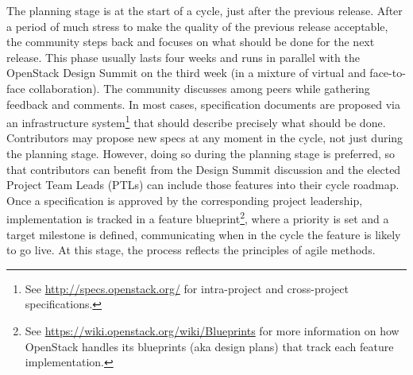 \documentclass[dvipsnames]{interact}
\theoremstyle{plain}\newtheorem{theorem}{Theorem}[section]
\theoremstyle{definition}
\theoremstyle{remark}
\begin{document}
The planning stage is at the start of a cycle, just after the previous release. After a period of much stress to make the quality of the previous release acceptable, the community steps back and focuses on what should be done for the next release. This phase usually lasts four weeks and runs in parallel with the OpenStack Design Summit on the third week (in a mixture of virtual and face-to-face collaboration). The community discusses among peers while gathering feedback and comments. In most cases, specification documents are proposed via an infrastructure system\footnote{See \url{http://specs.openstack.org/} for intra-project and cross-project specifications.}  that should describe precisely what should be done. Contributors may propose new specs at any moment in the cycle, not just during the planning stage. However, doing so during the planning stage is preferred, so that contributors can benefit from the Design Summit discussion and the elected Project Team Leads (PTLs) can include those features into their cycle roadmap. Once a specification is  approved by the corresponding project leadership, implementation is tracked in a feature blueprint\footnote{See \url{https://wiki.openstack.org/wiki/Blueprints} for more information on how OpenStack handles its blueprints (aka design plans) that track each feature implementation.}, where a priority is set and a target milestone is defined, communicating when in the cycle the feature is likely to go live. At this stage, the process reflects the principles of agile methods. 
\end{document}
